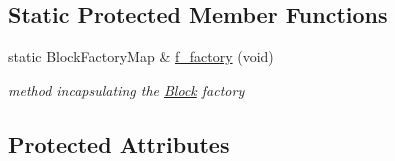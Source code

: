 \subsection*{Static Protected Member Functions}
\begin{DoxyCompactItemize}
\item 
static Block\+Factory\+Map \& \mbox{\hyperlink{class_s_m_spp__di__unipi__it_1_1_block_aca05cf94fb99b94e53cda94695f54551}{f\+\_\+factory}} (void)
\begin{DoxyCompactList}\small\item\em method incapsulating the \mbox{\hyperlink{class_s_m_spp__di__unipi__it_1_1_block}{Block}} factory \end{DoxyCompactList}\end{DoxyCompactItemize}
\subsection*{Protected Attributes}
